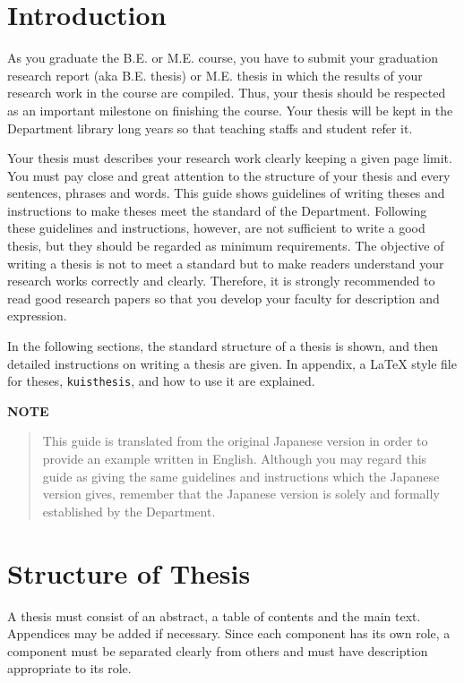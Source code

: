 \documentclass[master,english]{kuisthesis}
\begin{document}
\tableofcontents				%

\section{Introduction}\label{sec-intro}		%
As you graduate the B.E. or M.E. course, you have to submit your graduation
research report (aka B.E. thesis) or M.E. thesis in which the results of
your research work in the course are compiled.  Thus, your thesis should be
respected as an important milestone on finishing the course.  Your thesis
will be kept in the Department library long years so that teaching staffs
and student refer it.

Your thesis must describes your research work clearly keeping a given page
limit.  You must pay close and great attention to the structure of your
thesis and every sentences, phrases and words.  This guide shows guidelines
of writing theses and instructions to make theses meet the standard of the
Department.  Following these guidelines and instructions, however, are not
sufficient to write a good thesis, but they should be regarded as minimum
requirements.  The objective of writing a thesis is not to meet a standard
but to make readers understand your research works correctly and clearly.
Therefore, it is strongly recommended to read good research papers so that
you develop your faculty for description and expression.

In the following sections, the standard structure of a thesis is shown, and
then detailed instructions on writing a thesis are given.  In appendix, a
\LaTeX{} style file for theses, \verb|kuisthesis|, and how to use it are
explained.

\par\bigskip\centerline{\bf NOTE}
\begin{quote}
  This guide is translated from the original Japanese version in order
  to provide an example written in English.  Although you may regard
  this guide as giving the same guidelines and instructions which the
  Japanese version gives, remember that the Japanese version is solely
  and formally established by the Department.
\end{quote}

\section{Structure of Thesis}\label{sec-structure}
A thesis must consist of an abstract, a table of contents and the main text.
Appendices may be added if necessary.  Since each component has its own role,
a component must be separated clearly from others and must have description
appropriate to its role.
\end{document}

